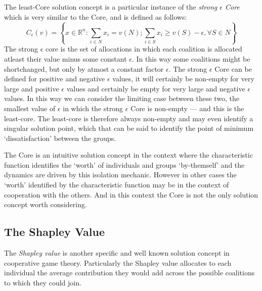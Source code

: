 The least-Core solution concept is a particular instance of the \textit{strong $\epsilon$ Core} which is very similar to the Core, and is defined as follows:
$$ C_\epsilon(v) = \left\{x\in\mathbb{R}^n : \sum_{i\in N}x_i=v(N); \sum_{i\in S}x_i \ge v(S)-\epsilon, \forall S\in N \right\}$$
The strong $\epsilon$ core is the set of allocations in which each coalition is allocated atleast their value minus some constant $\epsilon$.
In this way some coalitions might be shortchanged, but only by atmost a constant factor $\epsilon$.
The strong $\epsilon$ Core can be defined for positive and negative $\epsilon$ values, it will certainly be non-empty for very large and positive $\epsilon$ values and certainly be empty for very large and negative $\epsilon$ values.
In this way we can consider the limiting case between these two, the smallest value of $\epsilon$ in which the strong $\epsilon$ Core is non-empty --- and this is the least-core.\cite{doi:10.1287/moor.4.4.303}
The least-core is therefore always non-empty and may even identify a singular solution point, which that can be said to identify the point of minimum `dissatisfaction' between the groups.

The Core is an intuitive solution concept in the context where the characteristic function identifies the `worth' of individuals and groups `by-themself' and the dynamics are driven by this isolation mechanic.
However in other cases the `worth' identified by the characteristic function may be in the context of cooperation with the others.
And in this context the Core is not the only solution concept worth considering.

\subsection{The Shapley Value}\label{subsec:the_shapley_value}

The \textit{Shapley value} is another specific and well known solution concept in cooperative game theory.
Particularly the Shapley value allocates to each individual the average contribution they would add across the possible coalitions to which they could join.

